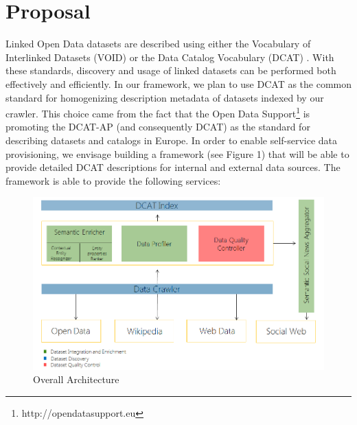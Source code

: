 \documentclass[onecolumn, crcready]{iosart2c}
\begin{document}

\section{Proposal}
Linked Open Data datasets are described using either the Vocabulary of Interlinked Datasets (VOID) \cite{Cyganiak:11:DLD} or the Data Catalog Vocabulary (DCAT) \cite{Maali:13:DCV}. With these standards, discovery and usage of linked datasets can be performed both effectively and efficiently. In our framework, we plan to use DCAT as the common standard for homogenizing description metadata of datasets indexed by our crawler. This choice came from the fact that the Open Data Support\footnote{http://opendatasupport.eu} is promoting the DCAT-AP (and consequently DCAT) as the standard for describing datasets and catalogs in Europe.
In order to enable self-service data provisioning, we envisage building a framework (see Figure 1) that will be able to provide detailed DCAT descriptions for internal and external data sources. The framework is able to provide the following services:
\begin{figure}[ht!]
  \centering
    \includegraphics[scale=0.5]{overall-architecture.png} 
  \caption{Overall Architecture}
\end{figure}
\end{document}

